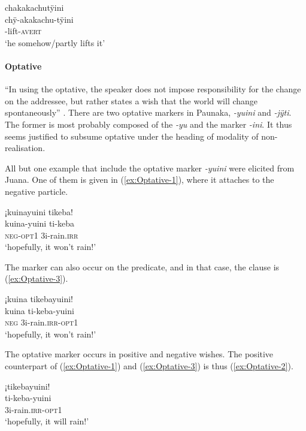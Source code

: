 \ea\label{ex:AVERT-3}
\begingl
\glpreamble chakakachutÿini\\
\gla chÿ-akakachu-tÿini\\
-lift-\textsc{avert}\\
\glft ‘he somehow/partly lifts it’
\endgl
\trailingcitation{[mtx-a110906l.065]}
\xe
{}

\paragraph{Optative}\label{sec:FRUST-Optative}

“In using the optative, the speaker does not impose responsibility for the change on the addressee, but rather states a wish that the world will change spontaneously” \citep[319]{Timberlake2007}. There are two optative markers in Paunaka, \textit{-yuini} and \textit{-jÿti}. The former is most probably composed of the  \textit{-yu} and the  marker \textit{-ini}. It thus seems justified to subsume optative under the heading of modality of non-realisation. 

All but one example that include the optative marker \textit{-yuini} were elicited from Juana. One of them is given in (\ref{ex:Optative-1}), where it attaches to the negative particle.

\ea\label{ex:Optative-1}
\begingl 
\glpreamble ¡kuinayuini tikeba!\\
\gla kuina-yuini ti-keba\\ 
\glb \textsc{neg}-\textsc{opt}1 3i-rain.\textsc{irr}\\ 
\glft ‘hopefully, it won’t rain!’\\ 
\endgl
\trailingcitation{[jxx-e110923l-2.055]}
\xe

The marker can also occur on the predicate, and in that case, the clause is (\ref{ex:Optative-3}).

\ea\label{ex:Optative-3}
\begingl
\glpreamble ¡kuina tikebayuini!\\
\gla kuina ti-keba-yuini\\
\glb \textsc{neg} 3i-rain.\textsc{irr}-\textsc{opt}1\\
\glft ‘hopefully, it won’t rain!’
\endgl
\trailingcitation{[jxx-e181101l-1]}
\xe

The optative marker occurs in positive and negative wishes. The positive counterpart of (\ref{ex:Optative-1}) and (\ref{ex:Optative-3}) is thus (\ref{ex:Optative-2}). 

\ea\label{ex:Optative-2}
\begingl 
\glpreamble ¡tikebayuini!\\
\gla ti-keba-yuini\\ 
\glb 3i-rain.\textsc{irr}-\textsc{opt}1\\ 
\glft ‘hopefully, it will rain!’\\ 
\endgl
\trailingcitation{[jxx-p150920l.034]}
\xe

